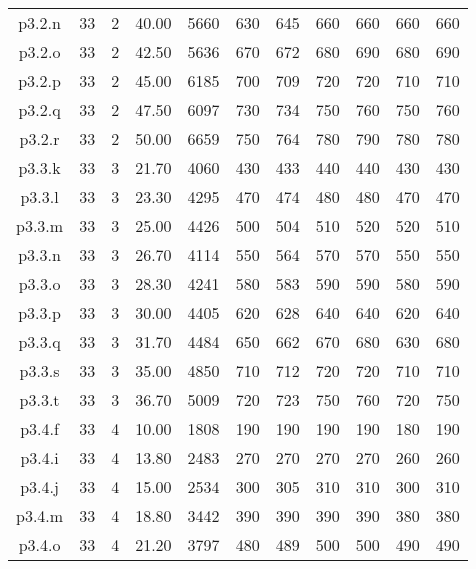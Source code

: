 \begin{center}
\begin{tabular}{ |c|c|c|c|c|c|c|c|c|c|c| }
p3.2.n & 33 & 2 & 40.00 & 5660 & 630 & 645 & 660 & 660 & 660 & 660  \\
p3.2.o & 33 & 2 & 42.50 & 5636 & 670 & 672 & 680 & 690 & 680 & 690  \\
p3.2.p & 33 & 2 & 45.00 & 6185 & 700 & 709 & 720 & 720 & 710 & 710  \\
p3.2.q & 33 & 2 & 47.50 & 6097 & 730 & 734 & 750 & 760 & 750 & 760  \\
p3.2.r & 33 & 2 & 50.00 & 6659 & 750 & 764 & 780 & 790 & 780 & 780  \\
p3.3.k & 33 & 3 & 21.70 & 4060 & 430 & 433 & 440 & 440 & 430 & 430  \\
p3.3.l & 33 & 3 & 23.30 & 4295 & 470 & 474 & 480 & 480 & 470 & 470  \\
p3.3.m & 33 & 3 & 25.00 & 4426 & 500 & 504 & 510 & 520 & 520 & 510  \\
p3.3.n & 33 & 3 & 26.70 & 4114 & 550 & 564 & 570 & 570 & 550 & 550  \\
p3.3.o & 33 & 3 & 28.30 & 4241 & 580 & 583 & 590 & 590 & 580 & 590  \\
p3.3.p & 33 & 3 & 30.00 & 4405 & 620 & 628 & 640 & 640 & 620 & 640  \\
p3.3.q & 33 & 3 & 31.70 & 4484 & 650 & 662 & 670 & 680 & 630 & 680  \\
p3.3.s & 33 & 3 & 35.00 & 4850 & 710 & 712 & 720 & 720 & 710 & 710  \\
p3.3.t & 33 & 3 & 36.70 & 5009 & 720 & 723 & 750 & 760 & 720 & 750  \\
p3.4.f & 33 & 4 & 10.00 & 1808 & 190 & 190 & 190 & 190 & 180 & 190  \\
p3.4.i & 33 & 4 & 13.80 & 2483 & 270 & 270 & 270 & 270 & 260 & 260  \\
p3.4.j & 33 & 4 & 15.00 & 2534 & 300 & 305 & 310 & 310 & 300 & 310  \\
p3.4.m & 33 & 4 & 18.80 & 3442 & 390 & 390 & 390 & 390 & 380 & 380  \\
p3.4.o & 33 & 4 & 21.20 & 3797 & 480 & 489 & 500 & 500 & 490 & 490  \\
\hline
\end{tabular}
\end{center}

